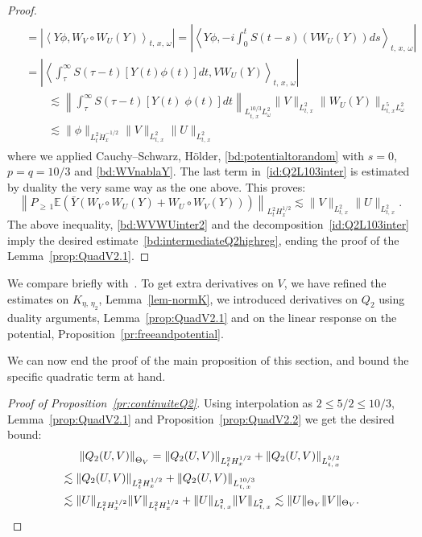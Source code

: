 \documentclass[AHL, Unicode, longabstracts,published]{cedram}
\newcommand{\E}{\mathbb{E}}
\begin{document}
\begin{proof}
\begin{multline*}
\begin{aligned}
&=\left| \left\langle Y\phi,W_V\circ W_U (Y)\right\rangle_{t,\,x,\,\omega}\right|= \left|\left\langle Y \phi,-i\int_0^t S(t-s)(VW_U(Y))ds\right\rangle_{t,\,x,\,\omega}\right|\\
&=\left| \left\langle \int_{\tau}^\infty S(\tau - t)[Y(t) \phi (t)]dt,V W_U(Y)\right\rangle_{t,\,x,\,\omega}\right| \\
&\qquad \lesssim \left\| \int_{\tau}^\infty S(\tau - t)\left[Y(t)\; \phi (t)\right]dt \right\|_{L^{10/3}_{t,\,x}L^2_\omega}\| V \|_{L^2_{t,\,x}} \| W_U(Y)\|_{L^{5}_{t,\,x}L^2_\omega}\\
&\qquad \lesssim \| \phi \|_{L^2_t\dot H^{-1/2}_x} \| V \|_{L^2_{t,\,x}} \| U \|_{L^2_{t,\,x}}
\end{aligned}
\end{multline*}
where we applied Cauchy--Schwarz, H\"older, \eqref{bd:potentialtorandom} with $s=0$, $p=q=10/3$ and \eqref{bd:WVnablaY}. The last term in~\eqref{id:Q2L103inter} is estimated by duality the very same way as the one above. This proves:
\[
\left\| P_{\geq\,1} \E\left(\bar Y\left(W_V\circ W_U(Y) + W_U\circ W_V(Y)\right)\right) \right\|_{L^2_t H^{1/2}_x} \lesssim \| V \|_{L^2_{t,\,x}} \| U \|_{L^2_{t,\,x}}.
\]
The above inequality, \eqref{bd:WVWUinter2} and the decomposition~\eqref{id:Q2L103inter} imply the desired estimate~\eqref{bd:intermediateQ2highreg}, ending the proof of the Lemma~\ref{prop:QuadV2.1}.
\end{proof}

\begin{rema}\label{rem:laRemarque}
We compare briefly with~\cite{lewsab2}. To get extra derivatives on $V$, we have refined the estimates on $K_{\eta,\,\eta_2}$, Lemma~\ref{lem-normK}, we introduced derivatives on $Q_2$ using duality arguments, Lemma~\ref{prop:QuadV2.1} and on the linear response on the potential, Proposition~\ref{pr:freeandpotential}.
\end{rema}



We can now end the proof of the main proposition of this section, and bound the specific quadratic term at hand.


\begin{proof}[Proof of Proposition~\ref{pr:continuiteQ2}]
Using interpolation as $2\leq 5/2\leq 10/3$, Lemma~\ref{prop:QuadV2.1} and Proposition~\ref{prop:QuadV2.2} we get the desired bound:
\begin{multline*}
\left\| Q_2(U,V)\right\|_{\Theta_V} =
\left\| Q_2(U,V)\right\|_{L^2_{t}H^{1/2}_x}+\left\| Q_2(U,V)\right\|_{L^{5/2}_{t,\,x}}\\
\begin{aligned}
&\lesssim \left\| Q_2(U,V)\right\|_{L^2_{t}H^{1/2}_x}+\left\| Q_2(U,V)\right\|_{L^{10/3}_{t,\,x}}\\
& \lesssim \| U\|_{L^2_{t}H^{1/2}_x}\| V\|_{L^2_{t}H^{1/2}_x}+\| U\|_{L^2_{t,\,x}}\| V\|_{L^2_{t,\,x}} \lesssim \| U \|_{\Theta_V}\| V\|_{\Theta_V}.\qedhere
\end{aligned}
\end{multline*}
\end{proof}
\end{document}
